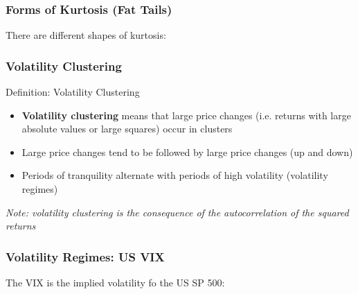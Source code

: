 \documentclass{beamer}
\begin{document}
\begin{frame}
  \frametitle{Forms of Kurtosis (Fat Tails)}
  There are different shapes of kurtosis:\\ 
\end{frame}


\begin{frame}
  \frametitle{Volatility Clustering}
  \begin{block}{Definition: Volatility Clustering}
    \begin{itemize}
    \item \textbf{Volatility clustering} means that large price changes (i.e. returns with large absolute values or large squares) occur in clusters
    \item Large price changes tend to be followed by large price changes (up and down)
    \item Periods of tranquility alternate with periods of high volatility (volatility regimes)
    \end{itemize}
    
    \emph{Note: volatility clustering is the consequence of the autocorrelation of the squared returns}\\
    
  \end{block}
\end{frame}


\begin{frame}
  \frametitle{Volatility Regimes: US VIX}
  The VIX is the implied volatility fo the US SP 500:\\ 
\end{frame}
\end{document}
